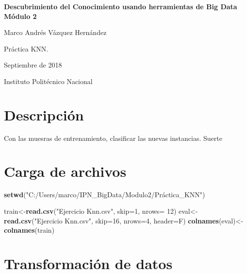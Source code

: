 \documentclass[]{article}
\title{}
\author{}
\date{}
\newenvironment{Shaded}{\begin{snugshade}}{\end{snugshade}}
\newcommand{\KeywordTok}[1]{\textcolor[rgb]{0.13,0.29,0.53}{\textbf{#1}}}
\newcommand{\DataTypeTok}[1]{\textcolor[rgb]{0.13,0.29,0.53}{#1}}
\newcommand{\DecValTok}[1]{\textcolor[rgb]{0.00,0.00,0.81}{#1}}
\newcommand{\StringTok}[1]{\textcolor[rgb]{0.31,0.60,0.02}{#1}}
\newcommand{\NormalTok}[1]{#1}
\begin{document}
\begin{centering}

\vspace*{5 cm}

\Huge

{\bf Descubrimiento del Conocimiento usando herramientas de Big Data Módulo 2}

\vspace{3 cm}

\Large
Marco Andrés Vázquez Hernández

\vspace{1 cm}
\normalsize
Práctica KNN. 

Septiembre de 2018

\normalsize
Instituto Politécnico Nacional


\end{centering}

\newpage

\section{Descripción}\label{descripcion}

Con las muesras de entrenamiento, clasificar las nuevas instancias.
Suerte

\section{Carga de archivos}\label{carga-de-archivos}

\begin{Shaded}
\begin{Highlighting}[]
\KeywordTok{setwd}\NormalTok{(}\StringTok{"C:/Users/marco/IPN_BigData/Modulo2/Práctica_KNN"}\NormalTok{)}

\NormalTok{train<-}\KeywordTok{read.csv}\NormalTok{(}\StringTok{"Ejercicio Knn.csv"}\NormalTok{, }\DataTypeTok{skip=}\DecValTok{1}\NormalTok{, }\DataTypeTok{nrows=} \DecValTok{12}\NormalTok{)}
\NormalTok{eval<-}\KeywordTok{read.csv}\NormalTok{(}\StringTok{"Ejercicio Knn.csv"}\NormalTok{, }\DataTypeTok{skip=}\DecValTok{16}\NormalTok{, }\DataTypeTok{nrows=}\DecValTok{4}\NormalTok{, }\DataTypeTok{header=}\NormalTok{F)}
\KeywordTok{colnames}\NormalTok{(eval)<-}\KeywordTok{colnames}\NormalTok{(train)}
\end{Highlighting}
\end{Shaded}

\section{Transformación de datos}\label{transformacion-de-datos}
\end{document}
